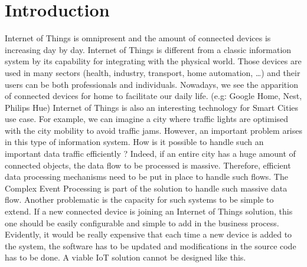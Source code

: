 \documentclass[11pt]{article}
\begin{document}

\section{Introduction}

Internet of Things is omnipresent and the amount of connected devices is increasing day by day. Internet of Things is different from a classic information system by its capability for integrating with the physical world. Those devices are used in many sectors (health, industry, transport, home automation, \ldots) and their users can be both professionals and individuals. Nowadays, we see the apparition of connected devices for home to facilitate our daily life. (e.g: Google Home, Nest, Philips Hue) Internet of Things is also an interesting technology for Smart Cities use case. For example, we can imagine a city where traffic lights are optimised with the city mobility to avoid traffic jams. However, an important problem arises in this type of information system. How is it possible to handle such an important data traffic efficiently ? Indeed, if an entire city has a huge amount of connected objects, the data flow to be processed is massive. Therefore, efficient data processing mechanisms need to be put in place to handle such flows.
\newline
\newline
The Complex Event Processing is part of the solution to handle such massive data flow. Another problematic is the capacity for such systems to be simple to extend. If a new connected device is joining an Internet of Things solution, this one should be easily configurable and simple to add in the business process. Evidently, it would be really expensive that each time a new device is added to the system, the software has to be updated and modifications in the source code has to be done. A viable IoT solution cannot be designed like this. 
\newline
\newline
\end{document}
